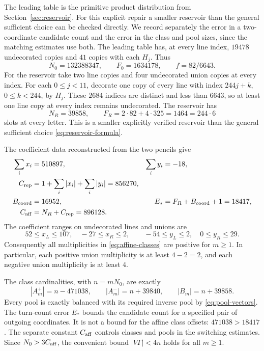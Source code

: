 The leading table is the primitive product distribution from Section~\ref{sec:reservoir}. For this explicit repair a smaller reservoir than the general sufficient choice can be checked directly. We record separately the error in a two-coordinate candidate count and the error in the class and pool sizes, since the matching estimates use both.
The leading table has, at every line index, $19478$ undecorated copies and $41$ copies with each $H_j$. Thus
\begin{equation}\label{eq:char3-bulk}
 N_0=132388347,
 \qquad F_0=1634178,
 \qquad f=82/6643.
\end{equation}
For the reservoir take two line copies and four undecorated union copies at every index. For each $0\le j<11$, decorate one copy of every line with index $244j+k$, $0\le k<244$, by $H_j$. These $2684$ indices are distinct and less than $6643$, so at least one line copy at every index remains undecorated. The reservoir has
\begin{equation}\label{eq:char3-reservoir}
 N_R=39858,
 \qquad F_R=2\cdot82+4\cdot325=1464=244\cdot6
\end{equation}
slots at every letter. This is a smaller explicitly verified reservoir than the general sufficient choice \eqref{eq:reservoir-formula}.

The coefficient data reconstructed from the two pencils give
\begin{equation}\label{eq:char3-errors}
\begin{aligned}
 \sum_i x_i&=510897, &\sum_i y_i&=-18,\\
 C_{\rm rep}&=1+\sum_i|x_i|+\sum_i|y_i|=856270,\\
 B_{\rm coord}&=16952, &E_*&=F_R+B_{\rm coord}+1=18417,\\
 C_{\rm aff}&=N_R+C_{\rm rep}=896128.
\end{aligned}
\end{equation}
The coefficient ranges on undecorated lines and unions are
\[
 52\le x_L\le107,\quad -27\le x_R\le2,
 \qquad -54\le y_L\le2,\quad 0\le y_R\le29.
\]
Consequently all multiplicities in \eqref{eq:affine-classes} are positive for $m\ge1$. In particular, each positive union multiplicity is at least $4-2=2$, and each negative union multiplicity is at least $4$.

The class cardinalities, with $n=mN_0$, are exactly
\begin{equation}\label{eq:char3-classes}
 |A_m^+|=n-471038,
 \qquad |A_m^-|=n+39840,
 \qquad |B_m|=n+39858.
\end{equation}
Every pool is exactly balanced with its required inverse pool by \eqref{eq:pool-vectors}. The turn-count error $E_*$ bounds the candidate count for a specified pair of outgoing coordinates. It is not a bound for the affine class offsets: $471038>18417$. The separate constant $C_{\rm aff}$ controls classes and pools in the switching estimates. Since $N_0>3C_{\rm aff}$, the convenient bound $|V\Gamma|<4n$ holds for all $m\ge1$.

